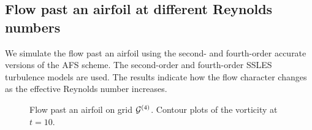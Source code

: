 

\subsection{Flow past an airfoil at different Reynolds numbers}\label{sec:airfoilWithDifferentReynolds}


We simulate the flow past an airfoil using the second- and fourth-order accurate versions of the AFS scheme.
The second-order and fourth-order SSLES turbulence models are used. The results indicate how the flow
character changes as the effective Reynolds number increases.

% 
{
\newcommand{\figWithCaption}[4]{
\begin{scope}[yshift=#1cm]
  \draw ( 0.0,0.0) node[anchor=south west,xshift=-4pt,yshift=+0pt] {\trimfiga{#2}{\figWidtha}};
  \draw ( 8.0,.10) node[anchor=south west,xshift=-4pt,yshift=+0pt] {\trimfigb{#3}{\figWidthb}};
  \draw ( 0.0,0.3 ) node[draw,fill=white,anchor=south west,xshift=+1pt,yshift=-4pt] {\scriptsize #4};
\end{scope}
}%
% 
\newcommand{\figWidtha}{7.5cm}
\newcommand{\figWidthb}{8.0cm}
\newcommand{\trimfiga}[2]{\trimPlotb{#1}{#2}{.15}{.15}{.3}{.3}}
\newcommand{\trimfigb}[2]{\trimPlotb{#1}{#2}{.0}{.12}{.275}{.275}}
\begin{figure}[hbt]
\begin{center}
\end{center}
 \caption{Flow past an airfoil on grid ${\mathcal G}^{(4)}$. Contour plots of the vorticity at $t=10$. 
         }
\end{figure}
}
